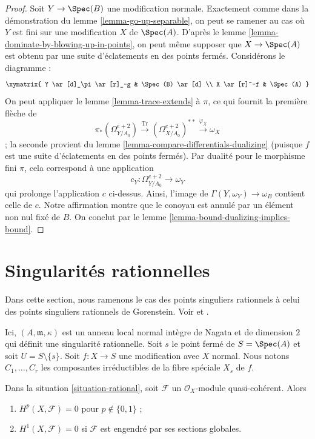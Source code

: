 \begin{proof}
\medskip\noindent Soit $Y \to \Spec(B)$ une modification normale. Exactement comme dans la démonstration du lemme \ref{lemma-go-up-separable}, on peut se ramener au cas où $Y$ est fini sur une modification $X$ de $\Spec(A)$. D'après le lemme \ref{lemma-dominate-by-blowing-up-in-points}, on peut même supposer que $X \to \Spec(A)$ est obtenu par une suite d'éclatements en des points fermés. Considérons le diagramme : $$
\xymatrix{
Y \ar[d]_\pi \ar[r]_-g & \Spec(B) \ar[d] \\
X \ar[r]^-f & \Spec(A)
}
$$ On peut appliquer le lemme \ref{lemma-trace-extends} à $\pi$, ce qui fournit la première flèche de $$
\pi_*(\Omega^{e + 2}_{Y/A_0})
\xrightarrow{\text{Tr}}
(\Omega^{e + 2}_{X/A_0})^{**}
\xrightarrow{\varphi_X}
\omega_X
$$ ; la seconde provient du lemme \ref{lemma-compare-differentials-dualizing} (puisque $f$ est une suite d'éclatements en des points fermés). Par dualité pour le morphisme fini $\pi$, cela correspond à une application $$
c_Y : \Omega^{e + 2}_{Y/A_0} \longrightarrow \omega_Y
$$ qui prolonge l'application $c$ ci-dessus. Ainsi, l'image de $\Gamma(Y, \omega_Y) \to \omega_B$ contient celle de $c$. Notre affirmation montre que le conoyau est annulé par un élément non nul fixé de $B$. On conclut par le lemme \ref{lemma-bound-dualizing-implies-bound}. \end{proof}






\section{Singularités rationnelles} \label{section-rational-singularities}

\noindent Dans cette section, nous ramenons le cas des points singuliers rationnels à celui des points singuliers rationnels de Gorenstein. Voir \cite{Lipman-rational} et \cite{Mattuck}.

\begin{situation} \label{situation-rational} Ici, $(A, \mathfrak m, \kappa)$ est un anneau local normal intègre de Nagata et de dimension $2$ qui définit une singularité rationnelle. Soit $s$ le point fermé de $S = \Spec(A)$ et soit $U = S \setminus \{s\}$. Soit $f : X \to S$ une modification avec $X$ normal. Nous notons $C_1, \ldots, C_r$ les composantes irréductibles de la fibre spéciale $X_s$ de $f$. \end{situation}

\begin{lemma} \label{lemma-globally-generated} Dans la situation \ref{situation-rational}, soit $\mathcal{F}$ un $\mathcal{O}_X$-module quasi-cohérent. Alors \begin{enumerate} \item $H^p(X, \mathcal{F}) = 0$ pour $p \not \in \{0, 1\}$ ; \item $H^1(X, \mathcal{F}) = 0$ si $\mathcal{F}$ est engendré par ses sections globales. \end{enumerate} \end{lemma}

